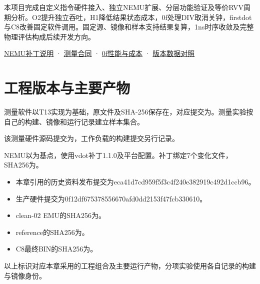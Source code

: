 本项目完成自定义指令硬件接入、独立NEMU扩展、分层功能验证及等价RVV周期分析。O2提升独立吞吐，H1降低结果状态成本，0f处理DIV取消关钟，firstdot与C8改善固定软件调用。固定源、镜像和样本支持结果复算，1ns时序收敛及完整物理评估构成后续开发方向。\par


\href{https://github.com/cc77-builder/riscv/blob/eca41d7cd959f5f3c4f240e382919c492d1ccb96/team/patches/nemu/README.md}{NEMU补丁说明} · \href{https://github.com/cc77-builder/riscv/blob/eca41d7cd959f5f3c4f240e382919c492d1ccb96/team/spec/measurement.md}{测量合同} · \href{https://github.com/cc77-builder/riscv/blob/eca41d7cd959f5f3c4f240e382919c492d1ccb96/team/optimizations/o2/r3-div-gate/PERFORMANCE\_COST\_RESULT.md}{0f性能与成本} · \href{https://github.com/cc77-builder/riscv/blob/eca41d7cd959f5f3c4f240e382919c492d1ccb96/team/docs/version-comparison-r5-g5-20261027.md}{版本数据对照}\par
\section{工程版本与主要产物}
测量软件以T13实现为基础，原文件及SHA-256保存在，对应提交为。测量实验按自己的构建、镜像和运行记录建立样本集合。\par
该测量硬件源码提交为，工作负载的构建提交另行记录。\par

NEMU以为基点，使用vdot补丁1.1.0及平台配置。补丁绑定7个变化文件，SHA256为。\par

\begin{itemize}
\item 本章引用的历史资料发布提交为eca41d7cd959f5f3c4f240e382919c492d1ccb96。
\item 生产硬件提交为0f12df675378556670afd0dd2153f47fcb330610。
\item clean-02 EMU的SHA256为。
\item reference的SHA256为。
\item C8最终BIN的SHA256为。
\end{itemize}
以上标识对应本章采用的工程组合及主要运行产物，分项实验使用各自记录的构建与镜像身份。
